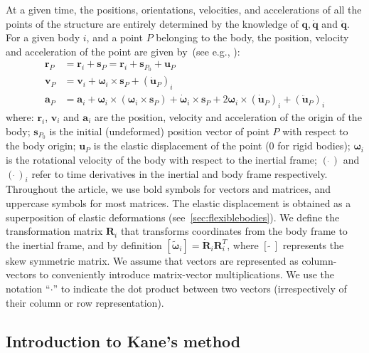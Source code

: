 \documentclass[wes, manuscript]{copernicus}
\renewcommand{\v}[1]{\boldsymbol{#1}}
\newcommand{\m}[1]{\boldsymbol{#1}}
\begin{document}
At a given time, the positions, orientations, velocities, and accelerations of all the points of the structure are entirely determined by the knowledge of $\v{q},\v{\dot{q}}$ and $\v{\ddot{q}}$. 
For a given body $i$, and a point $P$ belonging to the body, the position, velocity and acceleration of the point are given by~(see e.g., \cite{shabana:book}):
\begin{align}
\v{r}_P &= \v{r}_i + \v{s}_P = \v{r}_i+\v{s}_{P_0}+\v{u}_P\\
\v{v}_P &= \v{v}_i + \v{\omega}_i\times\v{s}_{P} + (\v{\dot{u}}_P)_i\\
\v{a}_P &= \v{a}_i + \v{\omega}_i\times(\v{\omega}_i\times \v{s}_P) 
        + \v{\dot{\omega}}_i\times\v{s}_{P}
        + 2\v{\omega}_i\times (\v{\dot{u}}_P)_i
        + (\v{\ddot{u}}_P)_i
\end{align}
where: $\v{r}_i$, $\v{v}_i$ and $\v{a}_i$ are the position, velocity and acceleration of the origin of the body; $\v{s}_{P_0}$ is the initial (undeformed) position vector of point $P$ with respect to the body origin; $\v{u}_P$ is the elastic displacement of the point ($0$ for rigid bodies); $\v{\omega}_i$ is the rotational velocity of the body with respect to the inertial frame;  $(\dot{\ })$ and $(\dot{\ })_i$ refer to time derivatives in the inertial and body frame respectively. 
Throughout the article, we use bold symbols for vectors and matrices, and uppercase symbols for most matrices.
The elastic displacement is obtained as a superposition of elastic deformations (see~\autoref{sec:flexiblebodies}).
We define the transformation matrix $\m{R}_i$ that transforms coordinates from the body frame to the inertial frame, and by definition
$[\v{\tilde{{\omega}}}_i] = \v{\dot{R}}_i\v{R}_i^T$, where $[\tilde{\ \ }]$ represents the skew symmetric matrix. 
We assume that vectors are represented as column-vectors to conveniently introduce matrix-vector multiplications.
We use the notation ``$\cdot$'' to indicate the dot product between two vectors (irrespectively of their column or row representation).










\subsection{Introduction to Kane's method}
\end{document}
